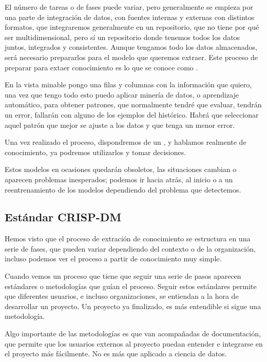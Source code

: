 El número de tareas o de fases puede variar, pero generalmente se empieza por una parte de integración de datos, con fuentes internas y externas con distintos formatos, que integraremos generalmente en un repositorio, que no tiene por qué ser multidimensional, pero sí un repositorio donde tenemos todos los datos juntos, integrados y consistentes. Aunque tengamos todo los datos almacenados, será necesario prepararlos para el modelo que queremos extraer. Este proceso de preparar para extaer conocimiento es lo que se conoce como .

En la vista minable pongo una filas y columnas con la información que quiero, una vez que tengo todo esto puedo aplicar minería de datos, o aprendizaje automático, para obtener patrones, que normalmente tendré que evaluar, tendrán un error, fallarán con alguno de los ejemplos del histórico. Habrá que seleccionar aquel patrón que mejor se ajuste a los datos y que tenga un menor error.

Una vez realizado el proceso, dispondremos de un , y hablamos realmente de conocimiento, ya podremos utilizarlos y tomar decisiones.

Estos modelos en ocasiones quedarán obsoletos, las situaciones cambian o aparecen problemas inesperados; podemos ir hacia atrás, al inicio o a un reentrenamiento de los modelos dependiendo del problema que detectemos.


\subsection{Estándar CRISP-DM}

Hemos visto que el proceso de extración de conocimiento se estructura en una serie de fases, que pueden variar dependiendo del contexto o de la organización, incluso podemos ver el proceso a partir de conocimiento muy simple. 

Cuando vemos un proceso que tiene que seguir una serie de pasos aparecen estándares o metodologías que guían el proceso. Seguir estos estándares permite que diferentes usuarios, e incluso organizaciones, se entiendan a la hora de desarrollar un proyecto. Un proyecto ya finalizado, es más entendible si sigue una metodología.

Algo importante de las metodologías es que van acompañadas de documentación, que permite que los usuarios externos al proyecto puedan entender e integrarse en el proyecto más fácilmente. No es más que  aplicado a ciencia de datos.


